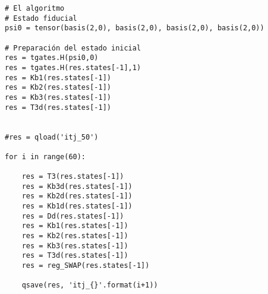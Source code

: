 \begin{verbatim}
# El algoritmo
# Estado fiducial
psi0 = tensor(basis(2,0), basis(2,0), basis(2,0), basis(2,0))

# Preparación del estado inicial
res = tgates.H(psi0,0)
res = tgates.H(res.states[-1],1)
res = Kb1(res.states[-1])
res = Kb2(res.states[-1])
res = Kb3(res.states[-1])
res = T3d(res.states[-1])


#res = qload('itj_50')

for i in range(60):
    
    res = T3(res.states[-1])
    res = Kb3d(res.states[-1])
    res = Kb2d(res.states[-1])
    res = Kb1d(res.states[-1])
    res = Dd(res.states[-1])
    res = Kb1(res.states[-1])
    res = Kb2(res.states[-1])
    res = Kb3(res.states[-1])
    res = T3d(res.states[-1])
    res = reg_SWAP(res.states[-1])
    
    qsave(res, 'itj_{}'.format(i+1))

\end{verbatim}


